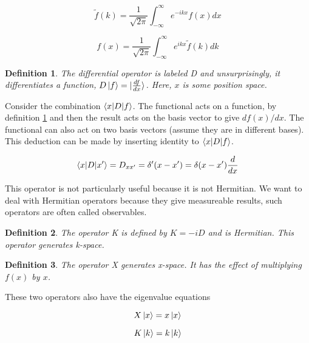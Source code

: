 \documentclass{tufte-book}
\newtheorem{definition}{Definition}
\newcommand{\infint}{\int^{\infty}_{-\infty}}
\begin{document}
\begin{equation}
	\label{eq:10}
	\widetilde{f}(k) = \frac{1}{\sqrt{2\pi}} \infint e^{-ikx}f(x)dx
\end{equation}

\begin{equation}
	\label{eq:11}
	f(x) = \frac{1}{\sqrt{2\pi}} \infint e^{ikx}\widetilde{f}(k)dk
\end{equation}

\begin{definition}
	\label{def:13}
	The differential operator is labeled D and unsurprisingly, it differentiates a function, $D\ket{f} = \ket{\frac{df}{dx}}$. Here, $x$ is some position space.
\end{definition}

Consider the combination $\braket{x|D|f}$. The functional acts on a function, by definition \ref{def:13} and then the result acts on the basis vector to give $df(x)/dx$. The functional can also act on two basis vectors (assume they are in different bases). This deduction can be made by inserting identity to $\braket{x|D|f}$.

\begin{equation}
	\label{eq:12}
	\braket{x|D|x'} = D_{xx'} = \delta'(x-x') = \delta(x-x')\frac{d}{dx}
\end{equation}

This operator is not particularly useful because it is not Hermitian. We want to deal with Hermitian operators because they give measureable results, such operators are often called observables.

\begin{definition}
	\label{def:14}
	The operator K is defined by $K = -iD$ and is Hermitian. This operator generates k-space.
\end{definition}

\begin{definition}
	\label{def:15}
	The operator X generates x-space. It has the effect of multiplying $f(x)$ by $x$.
\end{definition}

These two operators also have the eigenvalue equations

\begin{equation}
	\label{eq:13}
	X\ket{x} = x\ket{x}
\end{equation}

\begin{equation}
	\label{eq:14}
	K\ket{k} = k\ket{k}
\end{equation}
\end{document}
